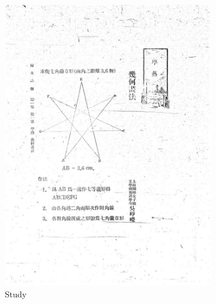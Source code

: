 \documentclass[12pt,twoside]{report}
\begin{document}
\begin{figure}[htbp]
\begin{subfigure}[b]{0.23\linewidth}
        \includegraphics[width=\linewidth]{./figures/fnzz3.3}
        \caption{Study}
        \label{fig:fnzz3.3}
    \end{subfigure}
    \hfill
    \begin{subfigure}[b]{0.23\linewidth}

\end{subfigure}
\end{figure}
\end{document}
